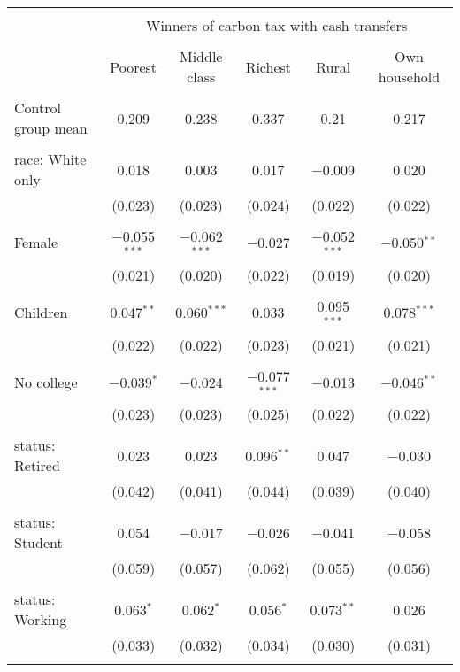 
\begin{tabular}{@{\extracolsep{5pt}}lccccc} 
\\[-1.8ex]\hline 
\hline \\[-1.8ex] 
 & \multicolumn{5}{c}{Winners of carbon tax with cash transfers} \\ 
\cline{2-6} 
\\[-1.8ex] & Poorest & Middle class & Richest & Rural & Own household \\ 
\hline \\[-1.8ex] 
 Control group mean & 0.209 & 0.238 & 0.337 & 0.21 & 0.217  \\ \hline \\[-1.8ex] race: White only & 0.018 & 0.003 & 0.017 & $-$0.009 & 0.020 \\ 
  & (0.023) & (0.023) & (0.024) & (0.022) & (0.022) \\ 
  & & & & & \\ 
 Female & $-$0.055$^{***}$ & $-$0.062$^{***}$ & $-$0.027 & $-$0.052$^{***}$ & $-$0.050$^{**}$ \\ 
  & (0.021) & (0.020) & (0.022) & (0.019) & (0.020) \\ 
  & & & & & \\ 
 Children & 0.047$^{**}$ & 0.060$^{***}$ & 0.033 & 0.095$^{***}$ & 0.078$^{***}$ \\ 
  & (0.022) & (0.022) & (0.023) & (0.021) & (0.021) \\ 
  & & & & & \\ 
 No college & $-$0.039$^{*}$ & $-$0.024 & $-$0.077$^{***}$ & $-$0.013 & $-$0.046$^{**}$ \\ 
  & (0.023) & (0.023) & (0.025) & (0.022) & (0.022) \\ 
  & & & & & \\ 
 status: Retired & 0.023 & 0.023 & 0.096$^{**}$ & 0.047 & $-$0.030 \\ 
  & (0.042) & (0.041) & (0.044) & (0.039) & (0.040) \\ 
  & & & & & \\ 
 status: Student & 0.054 & $-$0.017 & $-$0.026 & $-$0.041 & $-$0.058 \\ 
  & (0.059) & (0.057) & (0.062) & (0.055) & (0.056) \\ 
  & & & & & \\ 
 status: Working & 0.063$^{*}$ & 0.062$^{*}$ & 0.056$^{*}$ & 0.073$^{**}$ & 0.026 \\ 
  & (0.033) & (0.032) & (0.034) & (0.030) & (0.031) \\ 
  & & & & & \\ 

\end{tabular}
